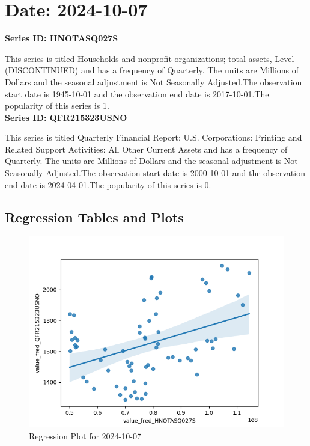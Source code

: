 \section{Date: 2024-10-07}
\noindent \textbf{Series ID: HNOTASQ027S} 

\noindent This series is titled Households and nonprofit organizations; total assets, Level (DISCONTINUED) and has a frequency of Quarterly. The units are Millions of Dollars and the seasonal adjustment is Not Seasonally Adjusted.The observation start date is 1945-10-01 and the observation end date is 2017-10-01.The popularity of this series is 1. \\ 

\noindent \textbf{Series ID: QFR215323USNO} 

\noindent This series is titled Quarterly Financial Report: U.S. Corporations: Printing and Related Support Activities: All Other Current Assets and has a frequency of Quarterly. The units are Millions of Dollars and the seasonal adjustment is Not Seasonally Adjusted.The observation start date is 2000-10-01 and the observation end date is 2024-04-01.The popularity of this series is 0. \\ 

\subsection{Regression Tables and Plots}


\begin{figure}
\centering
\includegraphics[scale = 0.9]{plots/plot_2024-10-07.png}
\caption{Regression Plot for 2024-10-07}
\end{figure}
\newpage
